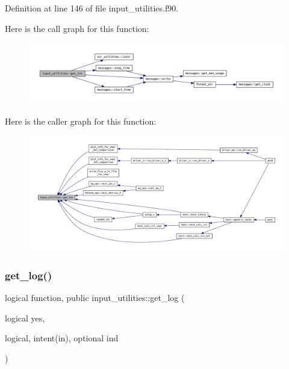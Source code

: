 Definition at line 146 of file input\+\_\+utilities.\+f90.

Here is the call graph for this function\+:
\nopagebreak
\begin{figure}[H]
\begin{center}
\leavevmode
\includegraphics[width=350pt]{namespaceinput__utilities_a03e09af96ba6f7e187ea4a1d9b743148_cgraph}
\end{center}
\end{figure}
Here is the caller graph for this function\+:
\nopagebreak
\begin{figure}[H]
\begin{center}
\leavevmode
\includegraphics[width=350pt]{namespaceinput__utilities_a03e09af96ba6f7e187ea4a1d9b743148_icgraph}
\end{center}
\end{figure}
\mbox{\label{namespaceinput__utilities_ad9ce824c30b32041ab70f3fb191f06db}} 
\subsubsection{\texorpdfstring{get\+\_\+log()}{get\_log()}}
{\footnotesize\ttfamily logical function, public input\+\_\+utilities\+::get\+\_\+log (\begin{DoxyParamCaption}\item[{logical}]{yes,  }\item[{logical, intent(in), optional}]{ind }\end{DoxyParamCaption})}



